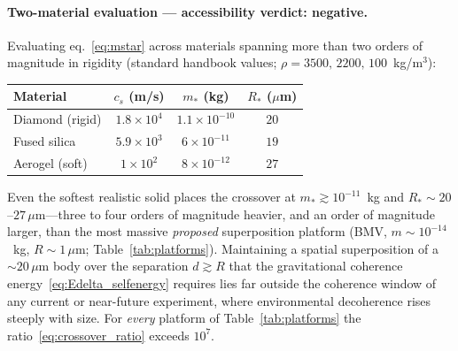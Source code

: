 \documentclass[12pt,a4paper]{article}
\theoremstyle{remark}
\begin{document}
\paragraph{Two-material evaluation --- accessibility verdict: negative.} Evaluating
eq.~\eqref{eq:mstar} across materials spanning more than two orders of magnitude in
rigidity (standard handbook values; $\rho = 3500,\,2200,\,100$~kg/m$^3$):
\begin{center}
\begin{tabular}{lccc}
\toprule
Material & $c_s$ (m/s) & $m_\ast$ (kg) & $R_\ast$ ($\mu$m) \\
\midrule
Diamond (rigid) & $1.8\times10^{4}$ & $1.1\times10^{-10}$ & $20$ \\
Fused silica    & $5.9\times10^{3}$ & $6\times10^{-11}$   & $19$ \\
Aerogel (soft)  & $1\times10^{2}$   & $8\times10^{-12}$   & $27$ \\
\bottomrule
\end{tabular}
\end{center}
Even the softest realistic solid places the crossover at $m_\ast\gtrsim10^{-11}$~kg and
$R_\ast\sim20$--$27\,\mu$m---three to four orders of magnitude heavier, and an order of
magnitude larger, than the most massive \emph{proposed} superposition platform (BMV,
$m\sim10^{-14}$~kg, $R\sim1\,\mu$m; Table~\ref{tab:platforms}). Maintaining a spatial
superposition of a $\sim\!20\,\mu$m body over the separation $d\gtrsim R$ that the
gravitational coherence energy~\eqref{eq:Edelta_selfenergy} requires lies far outside the
coherence window of any current or near-future experiment, where environmental
decoherence rises steeply with size. For \emph{every} platform of
Table~\ref{tab:platforms} the ratio~\eqref{eq:crossover_ratio} exceeds $10^{7}$.
\end{document}
